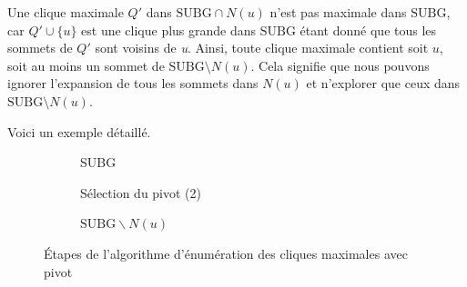 \documentclass[12pt,a4paper]{article}
\begin{document}
Une clique maximale \( Q' \) dans \( \text{SUBG} \cap N(u) \) n'est pas maximale dans \( \text{SUBG} \), car \( Q' \cup \{u\} \) est une clique plus grande dans \( \text{SUBG} \) étant donné que tous les sommets de \(Q'\) sont voisins de \emph{u}. Ainsi, toute clique maximale contient soit \( u \), soit au moins un sommet de \( \text{SUBG} \setminus N(u) \). Cela signifie que nous pouvons ignorer l'expansion de tous les sommets dans \( N(u) \) et n'explorer que ceux dans \( \text{SUBG} \setminus N(u) \).

Voici un exemple détaillé.

\begin{figure}[h!]
    \centering
    \begin{subfigure}[b]{0.45\textwidth}
        \centering
        \caption{SUBG}
        \label{fig:initial}
    \end{subfigure}
    \hfill
    \begin{subfigure}[b]{0.45\textwidth}
        \centering
        \caption{Sélection du pivot (2)}
        \label{fig:pivot}
    \end{subfigure}
    \vfill
    \begin{subfigure}[b]{0.5\textwidth}
        \centering
        \caption{\(\text{SUBG} \backslash N(u)\) }
        \label{fig:subgraph1}
    \end{subfigure}
    \caption{Étapes de l'algorithme d'énumération des cliques maximales avec pivot}
    \label{fig:cliques_algorithm}
\end{figure}
\end{document}
